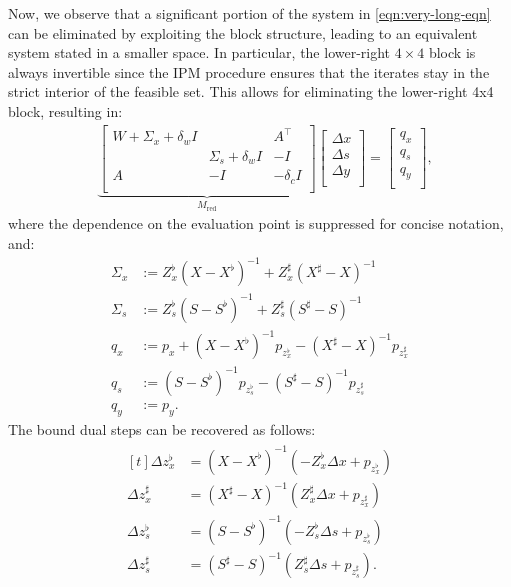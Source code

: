 Now, we observe that a significant portion of the system in
\eqref{eqn:very-long-eqn} can be eliminated by exploiting the block
structure, leading to an equivalent system stated in a smaller
space. In particular, the lower-right $4\times 4$ block is always
invertible since the IPM procedure ensures that the iterates stay in
the strict interior of the feasible set. This allows for eliminating
the lower-right 4x4 block, resulting in:
\begin{align}\label{eqn:very-long-reduced}
  &
    \underbrace{
    \begin{bmatrix}
      W  + \Sigma_x + \delta_w I & & A^{\top} \\
      & \Sigma_s + \delta_w I & -I\\
      A& -I & -\delta_c I\\
    \end{bmatrix}
  }_{M_{\text{red}}}
  \begin{bmatrix}
    \Delta x \\
    \Delta s \\
    \Delta y \\
  \end{bmatrix}=
  \begin{bmatrix}
    q_x \\
    q_s\\
    q_y\\
  \end{bmatrix},
\end{align}
where the dependence on the evaluation point is suppressed for concise notation, and:
\begin{align*}
  \Sigma_x&:= Z^\flat_x (X-X^\flat)^{-1}+ Z^\sharp_x (X^\sharp-X)^{-1}\\
  \Sigma_s&:= Z^\flat_s (S-S^\flat)^{-1}+ Z^\sharp_s (S^\sharp-S)^{-1}\\
  q_x&:=p_x + (X-X^\flat)^{-1} p_{z^\flat_x}-  (X^\sharp-X)^{-1} p_{z^\sharp_x}\\
  q_s&:= (S-S^\flat)^{-1} p_{z^\flat_s}-  (S^\sharp-S)^{-1} p_{z^\sharp_s}\\
  q_y&:=p_y.
\end{align*}
The bound dual steps can be recovered as follows:
\begin{align}\label{eqn:recover-1}
  \begin{aligned}[t]
    \Delta z^\flat_x &= \left(X-X^\flat\right)^{-1} \left(-Z^\flat_x \Delta x  + p_{z^\flat_x}\right)\\
    \Delta z^\sharp_x &= \left(X^\sharp-X\right)^{-1} \left(Z^\sharp_x \Delta x  + p_{z^\sharp_x}\right)\\
    \Delta z^\flat_s &= \left(S-S^\flat\right)^{-1} \left(-Z^\flat_s \Delta s  + p_{z^\flat_s}\right)\\
    \Delta z^\sharp_s &= \left(S^\sharp-S\right)^{-1} \left(Z^\sharp_s \Delta s  + p_{z^\sharp_s}\right).
  \end{aligned}
\end{align}
